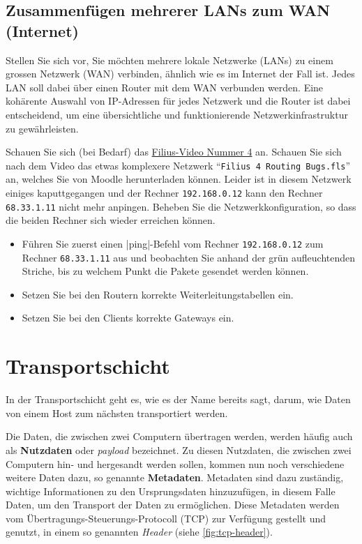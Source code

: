 \subsection{\texorpdfstring{Zusammenfügen mehrerer \glspl{LAN} zum \gls{WAN} (Internet)}{Zusammenfügen mehrerer LANs zum WAN (Internet)}}
Stellen Sie sich vor, Sie möchten mehrere lokale Netzwerke (\glspl{LAN}) zu einem grossen Netzwerk (\gls{WAN}) verbinden, ähnlich wie es im Internet der Fall ist. Jedes \gls{LAN} soll dabei über einen Router mit dem \gls{WAN} verbunden werden. Eine kohärente Auswahl von IP-Adressen für jedes Netzwerk und die Router ist dabei entscheidend, um eine übersichtliche und funktionierende Netzwerkinfrastruktur zu gewährleisten.


\begin{myexercise}
	Schauen Sie sich (bei Bedarf) das \href{https://www.youtube.com/watch?v=Kn8v_HrckUM&list=PLUfZiVdJui-57k0VcRecHX0JTEhOMgiKP}{Filius-Video Nummer 4} an. Schauen Sie sich nach dem Video das etwas komplexere Netzwerk \enquote{\texttt{Filius 4 Routing Bugs.fls}} an, welches Sie von Moodle herunterladen können. Leider ist in diesem Netzwerk einiges kaputtgegangen und der Rechner \texttt{192.168.0.12} kann den Rechner \texttt{68.33.1.11} nicht mehr anpingen. Beheben Sie die Netzwerkkonfiguration, so dass die beiden Rechner sich wieder erreichen können. 
	\begin{itemize}
		\item Führen Sie zuerst einen \commandbox*|ping|-Befehl vom Rechner \texttt{192.168.0.12} zum Rechner \texttt{68.33.1.11} aus und beobachten Sie anhand der grün aufleuchtenden Striche, bis zu welchem Punkt die Pakete gesendet werden können.
		\item Setzen Sie bei den Routern korrekte Weiterleitungstabellen ein.
		\item Setzen Sie bei den Clients korrekte Gateways ein.
	\end{itemize}
\end{myexercise}

\section{\texorpdfstring{\textcolor{\transportLayerColor}{Transportschicht}}{Transportschicht}}
In der Transportschicht geht es, wie es der Name bereits sagt, darum, wie Daten von einem Host zum nächsten transportiert werden.

Die Daten, die zwischen zwei Computern übertragen werden, werden häufig auch als \textbf{Nutzdaten} oder \textit{payload} bezeichnet. Zu diesen Nutzdaten, die zwischen zwei Computern hin- und hergesandt werden sollen, kommen nun noch verschiedene weitere Daten dazu, so genannte \textbf{Metadaten}. Metadaten sind dazu zuständig, wichtige Informationen zu den Ursprungsdaten hinzuzufügen, in diesem Falle Daten, um den Transport der Daten zu ermöglichen. Diese Metadaten werden vom Übertragungs-Steuerungs-Protocoll (\gls{TCP}) zur Verfügung gestellt und genutzt, in einem so genannten \textit{Header} (siehe \cref{fig:tcp-header}).

